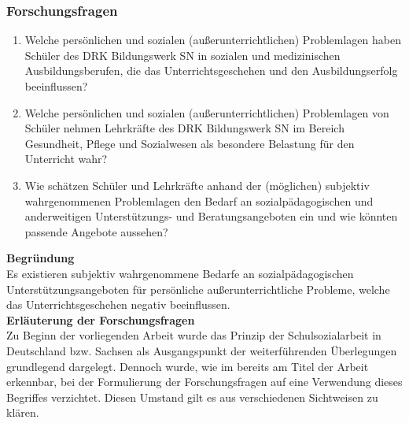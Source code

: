 \subsubsection{Forschungsfragen}
\label{sec:Forschungsfragen}

\begin{enumerate}
	\item Welche persönlichen und sozialen (außerunterrichtlichen) Problemlagen haben Schüler des DRK Bildungswerk SN in sozialen und medizinischen Ausbildungsberufen, die das Unterrichtsgeschehen und den Ausbildungserfolg beeinflussen?
	\item Welche persönlichen und sozialen (außerunterrichtlichen) Problemlagen von Schüler nehmen Lehrkräfte des DRK Bildungswerk SN im Bereich Gesundheit, Pflege und Sozialwesen als besondere Belastung für den Unterricht wahr?
	\item Wie schätzen Schüler und Lehrkräfte anhand der (möglichen) subjektiv wahrgenommenen Problemlagen den Bedarf an sozialpädagogischen und anderweitigen Unterstützungs- und Beratungsangeboten ein und wie könnten passende Angebote aussehen?
\end{enumerate}

\noindent
\textbf{Begründung}\\

\noindent
Es existieren subjektiv wahrgenommene Bedarfe an sozialpädagogischen Unterstützungsangeboten für persönliche außerunterrichtliche Probleme, welche das Unterrichtsgeschehen negativ beeinflussen.\\

\noindent
\textbf{Erläuterung der Forschungsfragen}\\

\noindent
Zu Beginn der vorliegenden Arbeit wurde das Prinzip der Schulsozialarbeit in Deutschland bzw. Sachsen als Ausgangspunkt der weiterführenden Überlegungen grundlegend dargelegt. Dennoch wurde, wie im bereits am Titel der Arbeit erkennbar, bei der Formulierung der Forschungsfragen auf eine Verwendung dieses Begriffes verzichtet. Diesen Umstand gilt es aus verschiedenen Sichtweisen zu klären.
 
